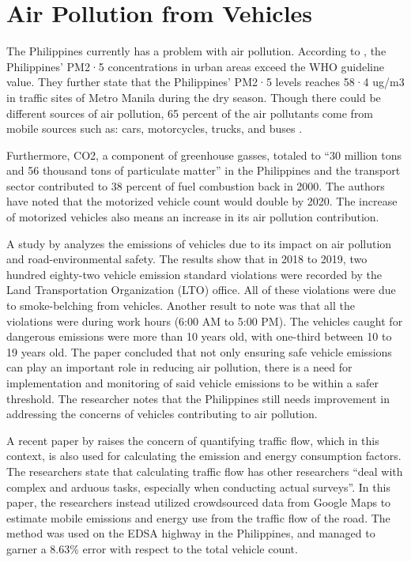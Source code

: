 \section{Air Pollution from Vehicles}
The Philippines currently has a problem with air pollution. According to \cite{TANTENGCO2022}, the Philippines’ PM2·5 concentrations in urban areas exceed the WHO guideline value. They further state that the Philippines’ PM2·5 levels reaches 58·4 ug/m3 in traffic sites of Metro Manila during the dry season. Though there could be different sources of air pollution, 65 percent of the air pollutants come from mobile sources such as: cars, motorcycles, trucks, and buses \cite{EMB_2015}.

	Furthermore, CO2, a component of greenhouse gasses, totaled  to “30 million tons and 56 thousand tons of particulate matter” \cite{FabianGota2009} in the Philippines and the transport sector contributed to 38 percent of fuel combustion back in 2000. The authors have noted that the motorized vehicle count would double by 2020. The increase of motorized vehicles also means an increase in its air pollution contribution. 

A study by \cite{lu_2022} analyzes the emissions of vehicles due to its impact on air pollution and road-environmental safety. The results show that in 2018 to 2019, two hundred eighty-two vehicle emission standard violations were recorded by the Land Transportation Organization (LTO) office. All of these violations were due to smoke-belching from vehicles. Another result to note was that all the violations were during work hours (6:00 AM to 5:00 PM). The vehicles caught for dangerous emissions were more than 10 years old, with one-third between 10 to 19 years old. The paper concluded that not only ensuring safe vehicle emissions can play an important role in reducing air pollution, there is a need for implementation and monitoring of said vehicle emissions to be within a safer threshold. The researcher notes that the Philippines still needs improvement in addressing the concerns of vehicles contributing to air pollution.

A recent paper by  raises the concern of quantifying traffic flow, which in this context, is also used for calculating the emission and energy consumption factors. The researchers state that calculating traffic flow has other researchers “deal with complex and arduous tasks, especially when conducting actual surveys”. In this paper, the researchers instead utilized crowdsourced data from Google Maps to estimate mobile emissions and energy use from the traffic flow of the road. The method was used on the EDSA highway in the Philippines, and managed to garner a 8.63\% error with respect to the total vehicle count.

